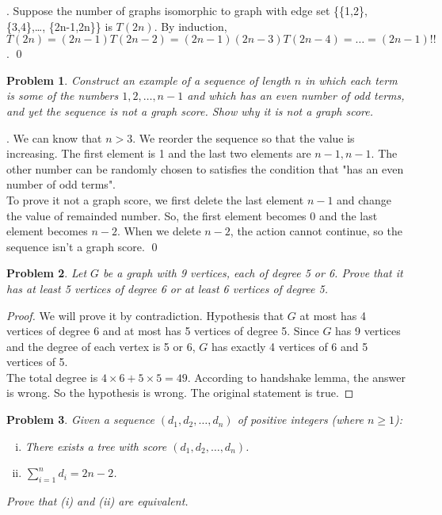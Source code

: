 \documentclass[12pt]{article}
\newtheorem{hw}{Problem}
\newenvironment{sol}
  {\par\vspace{3mm}\noindent{\it Solution}.}
  {\qed}
\begin{document}
\begin{sol}
    Suppose the number of graphs isomorphic to graph with edge set \{\{1,2\},\{3,4\},\ldots, \{2n-1,2n\}\} is $T(2n)$. By induction, $T(2n)=(2n-1)T(2n-2)=(2n-1)(2n-3)T(2n-4)=\ldots=(2n-1)!!$.
\end{sol}

\begin{hw}
Construct an example of a sequence of length $n$ in which each term is some of the numbers $1,2,\ldots, n-1$ and which has an even number of odd terms, and yet the sequence is not a graph score. Show why it is not a graph score.
\end{hw}

\begin{sol}
    We can know that $n>3$. We reorder the sequence so that the value is increasing. The first element is 1 and the last two elements are $n-1,n-1$. The other number can be randomly chosen to satisfies the condition that "has an even number of odd terms". \\
    To prove it not a graph score, we first delete the last element $n-1$ and change the value of remainded number. So, the first element becomes 0 and the last element becomes $n-2$. When we delete $n-2$, the action cannot continue, so the sequence isn't a graph score.
\end{sol}


\begin{hw}
Let $G$ be a graph with 9 vertices, each of degree 5 or 6. Prove that it has at least 5 vertices of degree 6 or at least 6 vertices of degree 5.
\end{hw}

\begin{proof}
    We will prove it by contradiction. Hypothesis that $G$ at most has 4 vertices of degree 6 and at most has 5 vertices of degree 5. Since $G$ has 9 vertices and the degree of each vertex is 5 or 6, $G$ has exactly 4 vertices of 6 and 5 vertices of 5.\\
    The total degree is $4\times 6+5\times 5=49$. According to handshake lemma, the answer is wrong. So the hypothesis is wrong. The original statement is true.
\end{proof}

\begin{hw}
Given a sequence $(d_1, d_2, \ldots, d_n)$ of  positive integers (where $n\geq 1$):
\begin{enumerate}[(i)]
  \item There exists a tree with score $(d_1, d_2, \ldots, d_n)$.
  \item $\sum_{i=1}^{n}d_i=2n-2$.
\end{enumerate}
Prove that (i) and (ii) are equivalent.
\end{hw}
\end{document}
